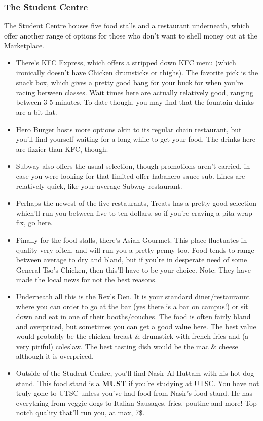 \documentclass[11pt]{article}
\begin{document}
\subsubsection{The Student Centre}
The Student Centre houses five food stalls and a restaurant underneath,
which offer another range of options for those who don't want to shell
money out at the Marketplace.

\begin{itemize}
    \item There's KFC Express, which offers a stripped down KFC menu
        (which ironically doesn't have Chicken drumsticks or thighs). The
        favorite pick is the snack box, which gives a pretty good bang for
        your buck for when you're racing between classes. Wait times here are
        actually relatively good, ranging between 3-5 minutes. To date though,
        you may find that the fountain drinks are a bit flat.
    \item Hero Burger hosts more options akin to its regular chain
        restaurant, but you'll find yourself waiting for a long while to get
        your food. The drinks here are fizzier than KFC, though.
    \item Subway also offers the usual selection, though promotions
        aren't carried, in case you were looking for that limited-offer habanero
        sauce sub. Lines are relatively quick, like your average Subway
        restaurant.
    \item Perhaps the newest of the five restaurants, Treats has a
        pretty good selection which'll run you between five to ten dollars, so
        if you're craving a pita wrap fix, go here.
    \item Finally for the food stalls, there's Asian Gourmet. This place
        fluctuates in quality very often, and will run you a pretty penny too.
        Food tends to range between average to dry and bland, but if you're
        in desperate need of some General Tso's Chicken, then this'll have to
        be your choice. Note: They have made the local news for not the best
        reasons.
    \item Underneath all this is the Rex's Den. It is your standard
        diner/restauraunt where you can order to go at the bar (yes there is a
        bar on campus!) or sit down and eat in one of their booths/couches. The
        food is often fairly bland and overpriced, but sometimes you can get a
        good value here. The best value would probably be the chicken breast
        \& drumstick with french fries and (a very pitiful) coleslaw. The best
        tasting dish would be the mac \& cheese although it is overpriced.
    \item Outside of the Student Centre, you'll find Nasir Al-Huttam
        with his hot dog stand. This food stand is a \textbf{MUST} if you're
        studying at UTSC. You have not truly gone to UTSC unless you've had food
        from Nasir's food stand. He has everything from veggie dogs to Italian
        Sausages, fries, poutine and more! Top notch quality that'll run you, at
        max, 7\$.
\end{itemize}
\end{document}
